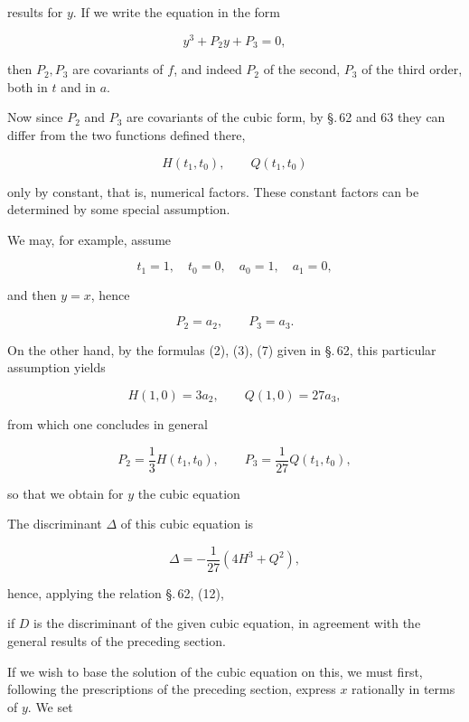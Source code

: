 

results for $y$. If we write the equation in the form

\[ y^3 + P_2y + P_3 = 0, \]

then $P_2, P_3$ are covariants of $f$, and indeed $P_2$ of the second, $P_3$ of the third order, both in $t$ and in $a$.

Now since $P_2$ and $P_3$ are covariants of the cubic form, by \S.\,62 and 63 they can differ from the two functions defined there,

\[ H(t_1,t_0), \qquad Q(t_1,t_0) \]

only by constant, that is, numerical factors. These constant factors can be determined by some special assumption.

We may, for example, assume

\[ t_1 = 1, \quad t_0 = 0, \quad a_0 = 1, \quad a_1 = 0, \]

and then $y=x$, hence

\[ P_2 = a_2, \qquad P_3 = a_3. \]

On the other hand, by the formulas (2), (3), (7) given in \S.\,62, this particular assumption yields

\[ H(1,0) = 3a_2, \qquad Q(1,0) = 27a_3, \]

from which one concludes in general

\[ P_2 = \frac{1}{3}H(t_1,t_0), \qquad P_3 = \frac{1}{27}Q(t_1,t_0), \]

so that we obtain for $y$ the cubic equation


The discriminant $\Delta$ of this cubic equation is

\[ \Delta = -\frac{1}{27}(4H^3 + Q^2), \]

hence, applying the relation \S.\,62, (12),



if $D$ is the discriminant of the given cubic equation, in agreement with the general results of the preceding section.

If we wish to base the solution of the cubic equation on this, we must first, following the prescriptions of the preceding section, express $x$ rationally in terms of $y$. We set

